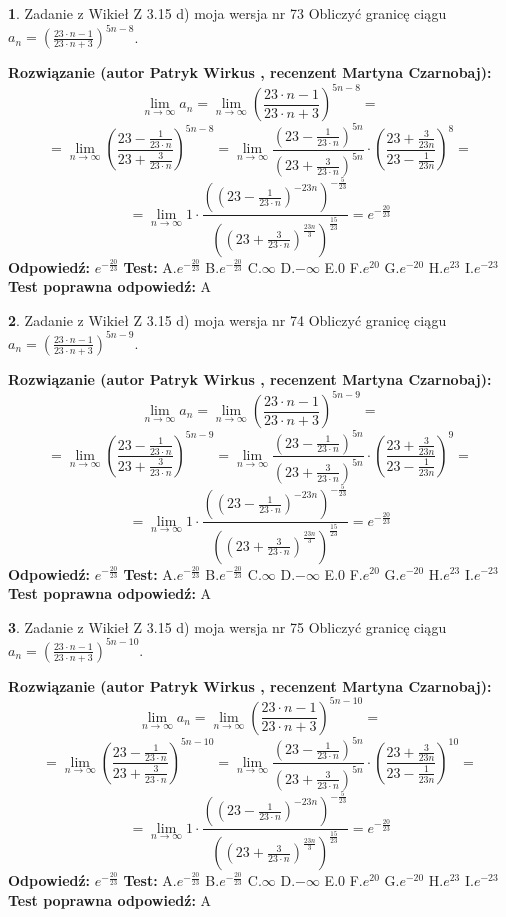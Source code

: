 \documentclass[12pt, a4paper]{article}
\theoremstyle{definition} %
\newtheorem{zad}{}
\newcommand{\zadStart}[1]{\begin{zad}#1\newline}
\newcommand{\zadStop}{\end{zad}}
\newcommand{\rozwStart}[2]{\noindent \textbf{Rozwiązanie (autor #1 , recenzent #2): }\newline}
\newcommand{\rozwStop}{\newline}
\newcommand{\odpStart}{\noindent \textbf{Odpowiedź:}\newline}
\newcommand{\odpStop}{\newline}
\newcommand{\testStart}{\noindent \textbf{Test:}\newline}
\newcommand{\testStop}{\newline}
\newcommand{\kluczStart}{\noindent \textbf{Test poprawna odpowiedź:}\newline}
\newcommand{\kluczStop}{\newline}
\begin{document}
\zadStart{Zadanie z Wikieł Z 3.15 d) moja wersja nr 73}
Obliczyć granicę ciągu $a_{n}=(\frac{23\cdot n - 1}{23 \cdot n + 3})^{5n-8}$.
\zadStop
\rozwStart{Patryk Wirkus}{Martyna Czarnobaj}
$$\lim\limits_{n\to\infty} a_{n} = \lim\limits_{n\to\infty}(\frac{23\cdot n - 1}{23 \cdot n + 3})^{5n-8}=$$
$$=\lim\limits_{n\to\infty}(\frac{23 - \frac{1}{23\cdot n}}{23 + \frac{3}{23 \cdot n}})^{5n-8}=\lim\limits_{n\to\infty}\frac{(23 - \frac{1}{23\cdot n})^{5n}}{(23 + \frac{3}{23\cdot n})^{5n}} \cdot (\frac{23+\frac{3}{23n}}{23-\frac{1}{23n}})^{8}=$$
$$=\lim\limits_{n\to\infty} 1 \cdot \frac{((23-\frac{1}{23 \cdot n})^{-23n})^{-\frac{5}{23}}}{((23+\frac{3}{23 \cdot n})^{\frac{23n}{3}})^{\frac{15}{23}}} =e^{-\frac{20}{23}}$$
\rozwStop
\odpStart
$e^{-\frac{20}{23}}$
\odpStop
\testStart
A.$ e^{-\frac{20}{23}}$
B.$ e^{-\frac{20}{23}}$
C.$\infty$
D.$-\infty$
E.$0$
F.$e^{20}$
G.$e^{-20}$
H.$e^{23}$
I.$e^{-23}$
\testStop
\kluczStart
A
\kluczStop



\zadStart{Zadanie z Wikieł Z 3.15 d) moja wersja nr 74}
Obliczyć granicę ciągu $a_{n}=(\frac{23\cdot n - 1}{23 \cdot n + 3})^{5n-9}$.
\zadStop
\rozwStart{Patryk Wirkus}{Martyna Czarnobaj}
$$\lim\limits_{n\to\infty} a_{n} = \lim\limits_{n\to\infty}(\frac{23\cdot n - 1}{23 \cdot n + 3})^{5n-9}=$$
$$=\lim\limits_{n\to\infty}(\frac{23 - \frac{1}{23\cdot n}}{23 + \frac{3}{23 \cdot n}})^{5n-9}=\lim\limits_{n\to\infty}\frac{(23 - \frac{1}{23\cdot n})^{5n}}{(23 + \frac{3}{23\cdot n})^{5n}} \cdot (\frac{23+\frac{3}{23n}}{23-\frac{1}{23n}})^{9}=$$
$$=\lim\limits_{n\to\infty} 1 \cdot \frac{((23-\frac{1}{23 \cdot n})^{-23n})^{-\frac{5}{23}}}{((23+\frac{3}{23 \cdot n})^{\frac{23n}{3}})^{\frac{15}{23}}} =e^{-\frac{20}{23}}$$
\rozwStop
\odpStart
$e^{-\frac{20}{23}}$
\odpStop
\testStart
A.$ e^{-\frac{20}{23}}$
B.$ e^{-\frac{20}{23}}$
C.$\infty$
D.$-\infty$
E.$0$
F.$e^{20}$
G.$e^{-20}$
H.$e^{23}$
I.$e^{-23}$
\testStop
\kluczStart
A
\kluczStop



\zadStart{Zadanie z Wikieł Z 3.15 d) moja wersja nr 75}
Obliczyć granicę ciągu $a_{n}=(\frac{23\cdot n - 1}{23 \cdot n + 3})^{5n-10}$.
\zadStop
\rozwStart{Patryk Wirkus}{Martyna Czarnobaj}
$$\lim\limits_{n\to\infty} a_{n} = \lim\limits_{n\to\infty}(\frac{23\cdot n - 1}{23 \cdot n + 3})^{5n-10}=$$
$$=\lim\limits_{n\to\infty}(\frac{23 - \frac{1}{23\cdot n}}{23 + \frac{3}{23 \cdot n}})^{5n-10}=\lim\limits_{n\to\infty}\frac{(23 - \frac{1}{23\cdot n})^{5n}}{(23 + \frac{3}{23\cdot n})^{5n}} \cdot (\frac{23+\frac{3}{23n}}{23-\frac{1}{23n}})^{10}=$$
$$=\lim\limits_{n\to\infty} 1 \cdot \frac{((23-\frac{1}{23 \cdot n})^{-23n})^{-\frac{5}{23}}}{((23+\frac{3}{23 \cdot n})^{\frac{23n}{3}})^{\frac{15}{23}}} =e^{-\frac{20}{23}}$$
\rozwStop
\odpStart
$e^{-\frac{20}{23}}$
\odpStop
\testStart
A.$ e^{-\frac{20}{23}}$
B.$ e^{-\frac{20}{23}}$
C.$\infty$
D.$-\infty$
E.$0$
F.$e^{20}$
G.$e^{-20}$
H.$e^{23}$
I.$e^{-23}$
\testStop
\kluczStart
A
\kluczStop
\end{document}
